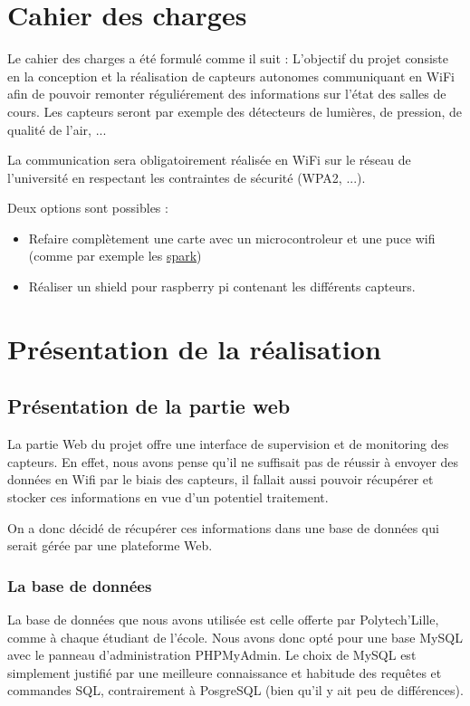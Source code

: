 \section{Cahier des charges}
	\par
	Le cahier des charges a été formulé comme il suit : L'objectif du
	projet consiste en la conception et la réalisation de capteurs autonomes
	communiquant en WiFi afin de pouvoir remonter réguliérement des informations
	sur l'état des salles de cours. Les capteurs seront par exemple des détecteurs de
	lumières, de pression, de qualité de l'air, ...
	\par
	La communication sera obligatoirement réalisée en WiFi sur le réseau
	de l'université en respectant les contraintes de sécurité (WPA2, ...).
	\par
	Deux options sont possibles :
	\begin{itemize}
    \item Refaire complètement une carte avec un microcontroleur et une
    puce wifi (comme par exemple les \href{https://www.spark.io/}{spark})
    \item Réaliser un shield pour raspberry pi contenant les différents capteurs. 
	\end{itemize}
	
\section{Présentation de la réalisation}
	\subsection{Présentation de la partie web}
		\par
		La partie Web du projet offre une interface de supervision et de monitoring des capteurs. En effet, nous avons pense qu'il ne suffisait pas de réussir à envoyer des données en Wifi par le biais des capteurs, il fallait aussi pouvoir récupérer et stocker ces informations en vue d'un potentiel traitement. 
		\par
		On a donc décidé de récupérer ces informations dans une base de données qui serait gérée par une plateforme Web.
		\subsubsection{La base de données}
		\par
		La base de données que nous avons utilisée est celle offerte par Polytech'Lille, comme à chaque étudiant de l'école. Nous avons donc opté pour une base MySQL avec le panneau d'administration PHPMyAdmin. Le choix de MySQL est simplement justifié par une meilleure connaissance et habitude des requêtes et commandes SQL, contrairement à PosgreSQL (bien qu'il y ait peu de différences).
